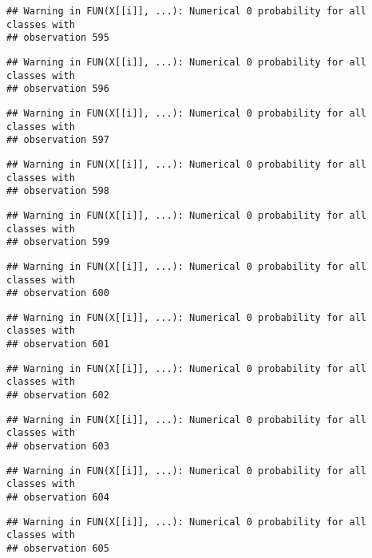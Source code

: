 \documentclass[
]{article}
\begin{document}
\begin{verbatim}
## Warning in FUN(X[[i]], ...): Numerical 0 probability for all classes with
## observation 595
\end{verbatim}

\begin{verbatim}
## Warning in FUN(X[[i]], ...): Numerical 0 probability for all classes with
## observation 596
\end{verbatim}

\begin{verbatim}
## Warning in FUN(X[[i]], ...): Numerical 0 probability for all classes with
## observation 597
\end{verbatim}

\begin{verbatim}
## Warning in FUN(X[[i]], ...): Numerical 0 probability for all classes with
## observation 598
\end{verbatim}

\begin{verbatim}
## Warning in FUN(X[[i]], ...): Numerical 0 probability for all classes with
## observation 599
\end{verbatim}

\begin{verbatim}
## Warning in FUN(X[[i]], ...): Numerical 0 probability for all classes with
## observation 600
\end{verbatim}

\begin{verbatim}
## Warning in FUN(X[[i]], ...): Numerical 0 probability for all classes with
## observation 601
\end{verbatim}

\begin{verbatim}
## Warning in FUN(X[[i]], ...): Numerical 0 probability for all classes with
## observation 602
\end{verbatim}

\begin{verbatim}
## Warning in FUN(X[[i]], ...): Numerical 0 probability for all classes with
## observation 603
\end{verbatim}

\begin{verbatim}
## Warning in FUN(X[[i]], ...): Numerical 0 probability for all classes with
## observation 604
\end{verbatim}

\begin{verbatim}
## Warning in FUN(X[[i]], ...): Numerical 0 probability for all classes with
## observation 605
\end{verbatim}
\end{document}
